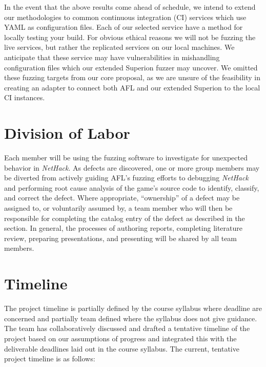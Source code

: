 \documentclass[12pt]{diazessay}
\begin{document}
In the event that the above results come ahead of schedule, we intend to extend our methodologies to common continuous integration (CI) services which use YAML as configuration files.
Each of our selected service have a method for locally testing your build.
For obvious ethical reasons we will not be fuzzing the live services, but rather the replicated services on our local machines.
We anticipate that these service may have vulnerabilities in mishandling configuration files which our extended Superion fuzzer may uncover.
We omitted these fuzzing targets from our core proposal, as we are unsure of the feasibility in creating an adapter to connect both AFL and our extended Superion to the local CI instances.

\section*{Division of Labor}

Each member will be using the fuzzing software to investigate for unexpected behavior in \emph{NetHack}.
As defects are discovered, one or more group members may be diverted from actively guiding AFL's fuzzing efforts to debugging \emph{NetHack} and performing root cause analysis of the game's source code to identify, classify, and correct the defect.
Where appropriate, ``ownership'' of a defect may be assigned to, or voluntarily assumed by, a team member who will then be responsible for completing the catalog entry of the defect as described in the  section.
In general, the processes of authoring reports, completing literature review, preparing presentations, and presenting will be shared by all team members.


\section*{Timeline}

The project timeline is partially defined by the course syllabus where deadline are concerned and partially team defined where the syllabus does not give guidance.
The team has collaboratively discussed and drafted a tentative timeline of the project based on our assumptions of progress and integrated this with the deliverable deadlines laid out in the course syllabus. The current, tentative project timeline is as follows:
\end{document}
